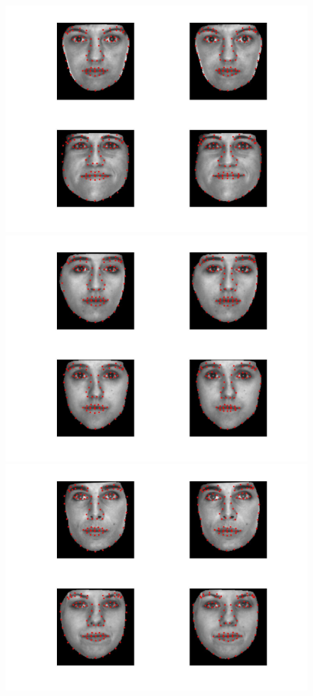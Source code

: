 \documentclass[12pt]{ctexart}
\begin{document}
\begin{enumerate}
\begin{figure}[H]
  \centering
\includegraphics[scale=0.18]{b_com_face_lm9.jpg}
\includegraphics[scale=0.18]{b_com_face_lm10.jpg}
\includegraphics[scale=0.18]{b_com_face_lm11.jpg}

\end{figure}
\end{enumerate}
\end{document}
